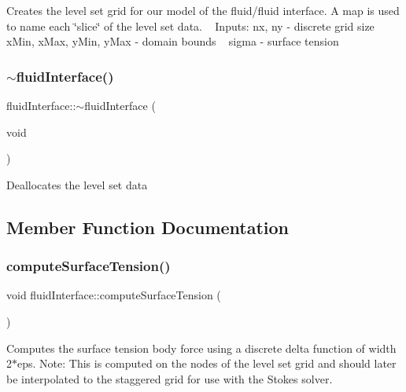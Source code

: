 Creates the level set grid for our model of the fluid/fluid interface. A map is used to name each \char`\"{}slice\char`\"{} of the level set data. ~\newline
Inputs\+: nx, ny -\/ discrete grid size ~\newline
x\+Min, x\+Max, y\+Min, y\+Max -\/ domain bounds ~\newline
sigma -\/ surface tension ~\newline
\mbox{\label{classfluidInterface_aae189149ce71b7a7484c4cf8a286e4b3}} 
\subsubsection{\texorpdfstring{$\sim$fluid\+Interface()}{~fluidInterface()}}
{\footnotesize\ttfamily fluid\+Interface\+::$\sim$fluid\+Interface (\begin{DoxyParamCaption}\item[{void}]{ }\end{DoxyParamCaption})}

Deallocates the level set data 

\subsection{Member Function Documentation}
\mbox{\label{classfluidInterface_aff4f820adb536fe0f36940f61348c03b}} 
\subsubsection{\texorpdfstring{compute\+Surface\+Tension()}{computeSurfaceTension()}\hspace{0.1cm}{\footnotesize\ttfamily [1/2]}}
{\footnotesize\ttfamily void fluid\+Interface\+::compute\+Surface\+Tension (\begin{DoxyParamCaption}{ }\end{DoxyParamCaption})}

Computes the surface tension body force using a discrete delta function of width 2$\ast$eps. Note\+: This is computed on the nodes of the level set grid and should later be interpolated to the staggered grid for use with the Stokes solver. \mbox{\label{classfluidInterface_a3e675a8c9b31ceb1dd1e58791edb9988}} 
